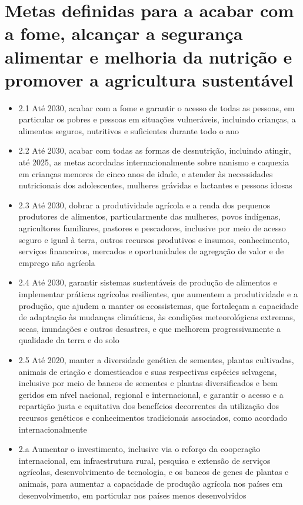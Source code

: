 \section{Metas definidas para a acabar com a fome, alcançar a segurança alimentar e melhoria da nutrição e promover a agricultura sustentável}
\begin{itemize}
\item 2.1 Até 2030, acabar com a fome e garantir o acesso de todas as pessoas, em particular os pobres e pessoas em situações vulneráveis, incluindo crianças, a alimentos seguros, nutritivos e suficientes durante todo o ano 
\item 2.2 Até 2030, acabar com todas as formas de desnutrição, incluindo atingir, até 2025, as metas acordadas internacionalmente sobre nanismo e caquexia em crianças menores de cinco anos de idade, e atender às necessidades nutricionais dos adolescentes, mulheres grávidas e lactantes e pessoas idosas 
\item 2.3 Até 2030, dobrar a produtividade agrícola e a renda dos pequenos produtores de alimentos, particularmente das mulheres, povos indígenas, agricultores familiares, pastores e pescadores, inclusive por meio de acesso seguro e igual à terra, outros recursos produtivos e insumos, conhecimento, serviços financeiros, mercados e oportunidades de agregação de valor e de emprego não agrícola
\item  2.4 Até 2030, garantir sistemas sustentáveis de produção de alimentos e implementar práticas agrícolas resilientes, que aumentem a produtividade e a produção, que ajudem a manter os ecossistemas, que fortaleçam a capacidade de adaptação às mudanças climáticas, às condições meteorológicas extremas, secas, inundações e outros desastres, e que melhorem progressivamente a qualidade da terra e do solo
\item 2.5 Até 2020, manter a diversidade genética de sementes, plantas cultivadas, animais de criação e domesticados e suas respectivas espécies selvagens, inclusive por meio de bancos de sementes e plantas diversificados e bem geridos em nível nacional, regional e internacional, e garantir o acesso e a repartição justa e equitativa dos benefícios decorrentes da utilização dos recursos genéticos e conhecimentos tradicionais associados, como acordado internacionalmente 
\item 2.a Aumentar o investimento, inclusive via o reforço da cooperação internacional, em infraestrutura rural, pesquisa e extensão de serviços agrícolas, desenvolvimento de tecnologia, e os bancos de genes de plantas e animais, para aumentar a capacidade de produção agrícola nos países em desenvolvimento, em particular nos países menos desenvolvidos 

\end{itemize}
